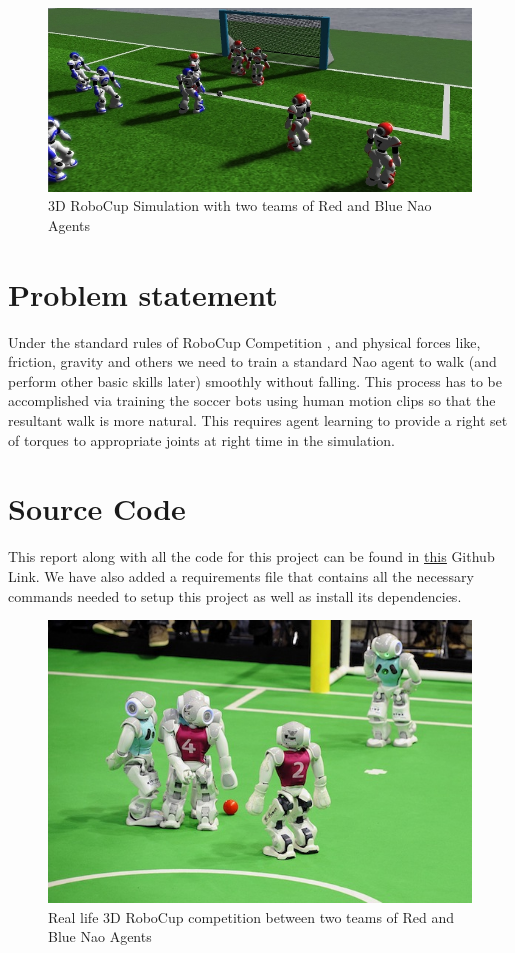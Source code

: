 \begin{figure}
\centering
  \includegraphics[width=\linewidth]{images/3DRoboCup.jpg}
  \caption{3D RoboCup Simulation with two teams of Red and Blue Nao Agents}
  \label{fig:robocup}
\end{figure}

\section{Problem statement}
Under the standard rules of RoboCup Competition \cite{usermanual}, and physical forces like, friction, gravity and others we need to train a standard Nao agent to walk (and perform other basic skills later) smoothly without falling. This process has to be accomplished via training the soccer bots using human motion clips so that the resultant walk is more natural. This requires agent learning to provide a right set of torques to appropriate joints at right time in the simulation. 

\section{Source Code}
This report along with all the code for this project can be found in \href{https://github.com/rishshah/RoboSoccer}{\underline{this}} Github Link. We have also added a requirements file that contains all the necessary commands needed to setup this project as well as install its dependencies.


\newpage

\begin{figure}
\centering
  \includegraphics[width=\linewidth]{images/3DRoboCup2.jpg}
  \caption{Real life 3D RoboCup competition between two teams of Red and Blue Nao Agents}
  \label{fig:robocup2}
\end{figure}

